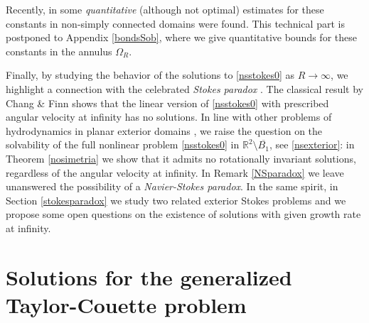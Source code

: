 \documentclass[a4paper,11pt]{article}
\numberwithin{equation}{section}
\numberwithin{figure}{section}
\begin{document}
Recently, in \cite{gazspefra,gazspe,cortona,gazzola2022connection} some {\em quantitative} (although not optimal) estimates for these constants in
non-simply connected domains were found. This technical part is postponed to Appendix \ref{bondsSob}, where we give
quantitative bounds for these constants in the annulus $\Omega_R$.\par
Finally, by studying the behavior of the solutions to \eqref{nsstokes0} as $R\to\infty$, we highlight a connection with the celebrated {\em Stokes paradox} \cite{stokes1851effect}. The classical result by Chang \& Finn \cite{chang1961solutions} shows that the linear version of \eqref{nsstokes0} with prescribed angular velocity at infinity has no solutions. In line with
other problems of hydrodynamics in planar exterior domains \cite{korobkov2019convergence,korobkov2020steady,korobkov2023stationary}, we raise the question on the solvability of the full nonlinear problem \eqref{nsstokes0} in $\mathbb{R}^2 \setminus \overline{B_{1}}$, see \eqref{nsexterior}:
in Theorem \eqref{nosimetria} we show that it admits no rotationally invariant solutions, regardless of the angular velocity at infinity.
In Remark \ref{NSparadox} we leave unanswered the possibility of a \textit{Navier-Stokes paradox}. In the same spirit, in Section \ref{stokesparadox} we study two related exterior Stokes problems and we propose some open questions on the existence of solutions with given growth rate at infinity.

\section{Solutions for the generalized Taylor-Couette problem} \label{uniquetc}
\end{document}
